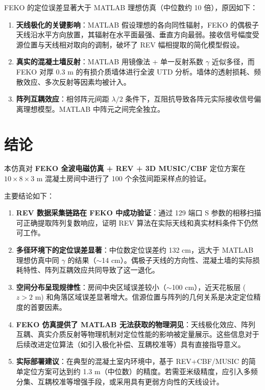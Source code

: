 \documentclass[12pt,a4paper]{ctexart}
\begin{document}
FEKO 的定位误差显著大于 MATLAB 理想仿真（中位数约 10 倍），原因如下：

\begin{enumerate}[itemsep=3pt]
    \item \textbf{天线极化的关键影响}：MATLAB 假设理想的各向同性辐射，FEKO 的偶极子天线沿水平方向放置，其辐射在水平面最强、垂直方向最弱。接收信号幅度受源位置与天线相对取向的调制，破坏了 REV 幅相提取的简化模型假设。
    \item \textbf{真实的混凝土墙反射}：MATLAB 用镜像法 + 单一反射系数 $\gamma$ 近似多径，而 FEKO 对厚 0.3 m 的有损介质墙体进行全波 UTD 分析。墙体的透射损耗、频散效应、多次反射等因素均被计入。
    \item \textbf{阵列互耦效应}：相邻阵元间距 $\lambda/2$ 条件下，互阻抗导致各阵元实际接收信号偏离理想模型。MATLAB 中阵元之间完全独立。
\end{enumerate}

\section{结论}

本仿真对 \textbf{FEKO 全波电磁仿真 + REV + 3D MUSIC/CBF} 定位方案在 $10\times8\times3$ m 混凝土房间中进行了 100 个余弦间距采样点的验证。

主要结论如下：

\begin{enumerate}[itemsep=5pt]
    \item \textbf{REV 数据采集链路在 FEKO 中成功验证}：通过 129 端口 S 参数的相移扫描可正确提取阵列复数响应，证明 REV 算法在实际天线和真实材料条件下仍然可工作。
    
    \item \textbf{多径环境下的定位误差显著}：中位数定位误差约 132 cm，远大于 MATLAB 理想仿真中同 $\gamma$ 的结果（$\sim$14 cm）。偶极子天线的方向性、混凝土墙的实际损耗特性、阵列互耦效应共同导致了这一退化。
    
    \item \textbf{空间分布呈现规律性}：房间中央区域误差较小（$\sim$100 cm），近天花板层 ($z > 2$ m) 和角落区域误差显著增大。信源位置与阵列的几何关系是决定定位精度的首要因素。
    
    \item \textbf{FEKO 仿真提供了 MATLAB 无法获取的物理洞见}：天线极化效应、阵列互耦、真实介质反射等物理机制对定位性能的影响被定量展示。这些信息对于后续改进定位算法（如引入极化补偿、互耦校准等）具有直接指导意义。
    
    \item \textbf{实际部署建议}：在典型的混凝土室内环境中，基于 REV+CBF/MUSIC 的简单定位方案可达到约 1.3 m（中位数）的精度。若需亚米级精度，应引入多频分集、互耦校准等增强手段，或采用具有更弱方向性的天线设计。
\end{enumerate}
\end{document}
